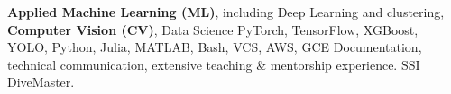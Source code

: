 
\begin{scholarship}
	{\textbf{Applied Machine Learning (ML)}, including Deep Learning and clustering, \textbf{Computer Vision (CV)}, Data Science%
 }
    {PyTorch, TensorFlow, XGBoost, YOLO, Python, Julia, MATLAB, Bash, VCS, AWS, GCE}
    {Documentation, technical communication, extensive teaching \& mentorship experience. SSI DiveMaster.}
\end{scholarship}